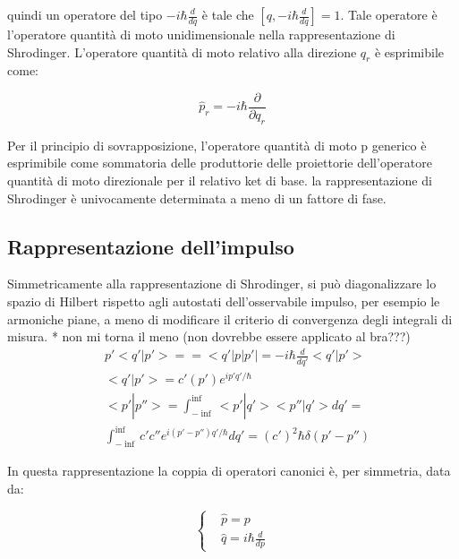 \documentclass{article}
\begin{document}
quindi un operatore del tipo $-i\hbar\frac{d}{dq}$ è tale che $[q,-i\hbar\frac{d}{dq}]=1$.
Tale operatore è l'operatore quantità di moto unidimensionale nella rappresentazione di Shrodinger.
L'operatore quantità di moto relativo alla direzione $q_r$ è esprimibile come:

\begin{equation}
    \hat{p}_r = -i\hbar \frac{\partial}{\partial q_r}
\end{equation}

Per il principio di sovrapposizione, l'operatore quantità di moto p generico è esprimibile come sommatoria
delle produttorie delle proiettorie dell'operatore quantità di moto direzionale per il relativo ket di base.
la rappresentazione di Shrodinger è univocamente determinata a meno di un fattore di fase.


\subsection{Rappresentazione dell'impulso}
Simmetricamente alla rappresentazione di Shrodinger, si può diagonalizzare lo spazio di Hilbert rispetto agli autostati dell'osservabile impulso, per
esempio le armoniche piane, a meno di modificare il criterio di convergenza degli integrali di misura.
* non mi torna il meno (non dovrebbe essere applicato al bra???)
\begin{equation}
    \begin{aligned}
         & p'<q'|p'>==<q'|p|p'|=-i\hbar\frac{d}{dq'}<q'|p'>                                \\
         & <q'|p'>=c'(p')e^{ip'q'/\hbar}                                                   \\
         & <p' | p''> = \int_{-\inf}^{\inf} <p' |q'><p''|q'>dq'=                           \\
         & \int_{-\inf}^{\inf} c'c'' e^{i(p'-p'')q'/\hbar}dq'= (c')^2 \hbar \delta(p'-p'')
    \end{aligned}
\end{equation}

In questa rappresentazione la coppia di operatori canonici è, per simmetria, data da:

\begin{equation}
    \left\{
    \begin{aligned}
         & \hat{p}=p                   \\
         & \hat{q}=i\hbar \frac{d}{dp}
    \end{aligned}
    \right.
\end{equation}
\end{document}
